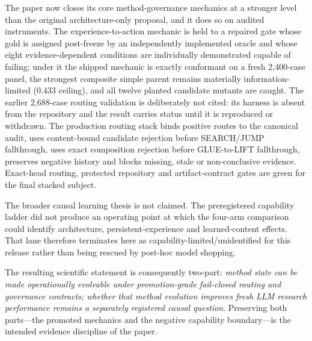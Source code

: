 The paper now closes its core method-governance mechanics at a stronger level than the original architecture-only proposal, and it does so on audited instruments.  The experience-to-action mechanic is held to a repaired gate whose gold is assigned post-freeze by an independently implemented oracle and whose eight evidence-dependent conditions are individually demonstrated capable of failing; under it the shipped mechanic is exactly conformant on a fresh 2,400-case panel, the strongest composite simple parent remains materially information-limited ($0.433$ ceiling), and all twelve planted candidate mutants are caught.  The earlier 2,688-case routing validation is deliberately not cited: its harness is absent from the repository and the result carries \CANNOTCHECK{} status until it is reproduced or withdrawn.  The production routing stack binds positive routes to the canonical audit, uses content-bound candidate rejection before SEARCH/JUMP fallthrough, uses exact composition rejection before GLUE-to-LIFT fallthrough, preserves negative history and blocks missing, stale or non-conclusive evidence.  Exact-head routing, protected repository and artifact-contract gates are green for the final stacked subject.

The broader causal learning thesis is not claimed.  The preregistered capability ladder did not produce an operating point at which the four-arm comparison could identify architecture, persistent-experience and learned-content effects.  That lane therefore terminates here as capability-limited/unidentified for this release rather than being rescued by post-hoc model shopping.

The resulting scientific statement is consequently two-part: \emph{method state can be made operationally evolvable under promotion-grade fail-closed routing and governance contracts; whether that method evolution improves fresh LLM research performance remains a separately registered causal question}.  Preserving both parts---the promoted mechanics and the negative capability boundary---is the intended evidence discipline of the paper.

